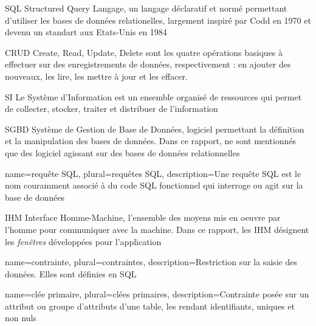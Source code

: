         {SQL}
        {Structured Query Langage, un langage déclaratif et normé permettant d'utiliser les bases de données relationelles, largement inspiré par Codd en 1970 et devenu un standart aux Etats-Unis en 1984}

                           {CRUD}
                           {Create, Read, Update, Delete sont les quatre opérations basiques à effectuer sur des enregistrements de données, respectivement : en ajouter des nouveaux, les lire, les mettre à jour et les effacer.}

                           {SI}
                           {Le Système d'Information est un ensemble organisé de ressources qui permet de collecter, stocker, traiter et distribuer de l'information}

                           {SGBD}
                           {Système de Gestion de Base de Données, logiciel permettant la définition et la manipulation des bases de données. Dans ce rapport, ne sont mentionnés que des logiciel agissant sur des bases de données relationnelles}

        {name={requête SQL},
        plural={requêtes SQL},
        description={Une requête SQL est le nom couramment associé à du code SQL fonctionnel qui interroge ou agit sur la base de données}}

	{IHM}
	{Interface Homme-Machine, l'ensemble des moyens mis en oeuvre par l'homme pour communiquer avec la machine.
	Dans ce rapport, les IHM désignent les \textit{fenêtres} développées pour l'application}

        {name={contrainte},
        plural={contraintes},
        description={Restriction sur la saisie des données. Elles sont définies en SQL}}

        {name={clée primaire},
        plural={clées primaires},
        description={Contrainte posée sur un attribut ou groupe d'attributs d'une table, les rendant identifiants, uniques et non nuls}}

